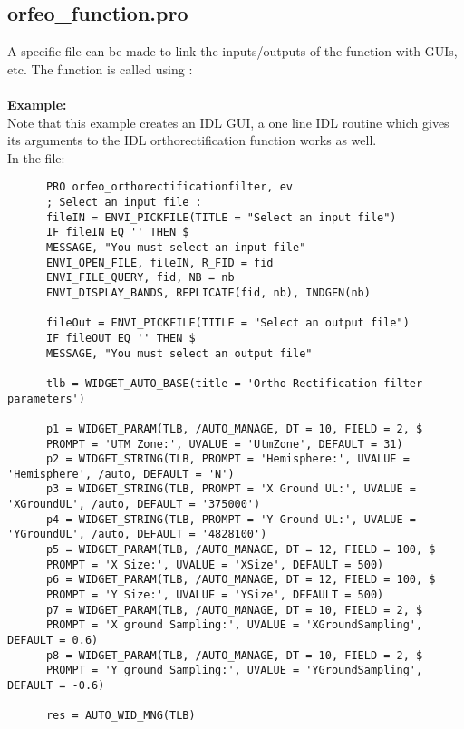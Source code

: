 \subsection{orfeo\_function.pro}
A specific file can be made to link the inputs/outputs of the function with GUIs, etc.
The function is called using :\\
\\
\textbf{Example:}\\
      Note that this example creates an IDL GUI, a one line IDL routine which gives its arguments to the IDL orthorectification function works as well.\\
      In the  file:\\
\begin{verbatim}
      PRO orfeo_orthorectificationfilter, ev
      ; Select an input file :
      fileIN = ENVI_PICKFILE(TITLE = "Select an input file")
      IF fileIN EQ '' THEN $
      MESSAGE, "You must select an input file"
      ENVI_OPEN_FILE, fileIN, R_FID = fid
      ENVI_FILE_QUERY, fid, NB = nb
      ENVI_DISPLAY_BANDS, REPLICATE(fid, nb), INDGEN(nb)

      fileOut = ENVI_PICKFILE(TITLE = "Select an output file")
      IF fileOUT EQ '' THEN $
      MESSAGE, "You must select an output file"

      tlb = WIDGET_AUTO_BASE(title = 'Ortho Rectification filter parameters')

      p1 = WIDGET_PARAM(TLB, /AUTO_MANAGE, DT = 10, FIELD = 2, $
      PROMPT = 'UTM Zone:', UVALUE = 'UtmZone', DEFAULT = 31)
      p2 = WIDGET_STRING(TLB, PROMPT = 'Hemisphere:', UVALUE = 'Hemisphere', /auto, DEFAULT = 'N')
      p3 = WIDGET_STRING(TLB, PROMPT = 'X Ground UL:', UVALUE = 'XGroundUL', /auto, DEFAULT = '375000')
      p4 = WIDGET_STRING(TLB, PROMPT = 'Y Ground UL:', UVALUE = 'YGroundUL', /auto, DEFAULT = '4828100')
      p5 = WIDGET_PARAM(TLB, /AUTO_MANAGE, DT = 12, FIELD = 100, $
      PROMPT = 'X Size:', UVALUE = 'XSize', DEFAULT = 500)
      p6 = WIDGET_PARAM(TLB, /AUTO_MANAGE, DT = 12, FIELD = 100, $
      PROMPT = 'Y Size:', UVALUE = 'YSize', DEFAULT = 500)
      p7 = WIDGET_PARAM(TLB, /AUTO_MANAGE, DT = 10, FIELD = 2, $
      PROMPT = 'X ground Sampling:', UVALUE = 'XGroundSampling', DEFAULT = 0.6)
      p8 = WIDGET_PARAM(TLB, /AUTO_MANAGE, DT = 10, FIELD = 2, $
      PROMPT = 'Y ground Sampling:', UVALUE = 'YGroundSampling', DEFAULT = -0.6)

      res = AUTO_WID_MNG(TLB)


\end{verbatim}
